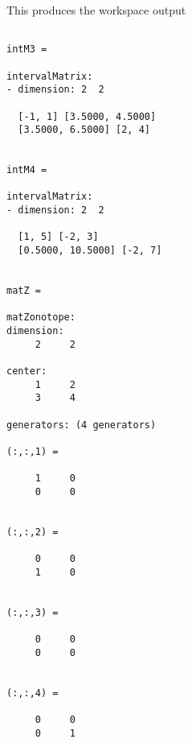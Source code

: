 This produces the workspace output
\begin{verbatim}

intM3 =

intervalMatrix:
- dimension: 2  2

  [-1, 1] [3.5000, 4.5000]
  [3.5000, 6.5000] [2, 4]


intM4 =

intervalMatrix:
- dimension: 2  2

  [1, 5] [-2, 3]
  [0.5000, 10.5000] [-2, 7]


matZ =

matZonotope:
dimension:
     2     2

center:
     1     2
     3     4

generators: (4 generators)

(:,:,1) =

     1     0
     0     0


(:,:,2) =

     0     0
     1     0


(:,:,3) =

     0     0
     0     0


(:,:,4) =

     0     0
     0     1
\end{verbatim}
